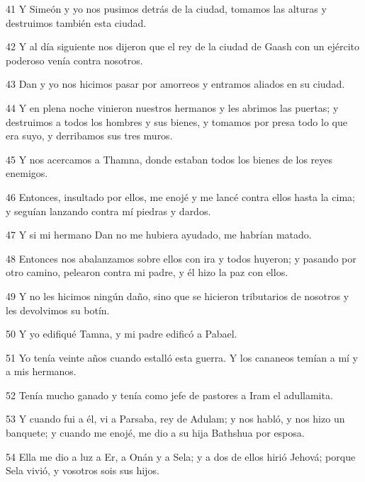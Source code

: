 \par 41 Y Simeón y yo nos pusimos detrás de la ciudad, tomamos las alturas y destruimos también esta ciudad.

\par 42 Y al día siguiente nos dijeron que el rey de la ciudad de Gaash con un ejército poderoso venía contra nosotros.

\par 43 Dan y yo nos hicimos pasar por amorreos y entramos aliados en su ciudad.

\par 44 Y en plena noche vinieron nuestros hermanos y les abrimos las puertas; y destruimos a todos los hombres y sus bienes, y tomamos por presa todo lo que era suyo, y derribamos sus tres muros.

\par 45 Y nos acercamos a Thamna, donde estaban todos los bienes de los reyes enemigos.

\par 46 Entonces, insultado por ellos, me enojé y me lancé contra ellos hasta la cima; y seguían lanzando contra mí piedras y dardos.

\par 47 Y si mi hermano Dan no me hubiera ayudado, me habrían matado.

\par 48 Entonces nos abalanzamos sobre ellos con ira y todos huyeron; y pasando por otro camino, pelearon contra mi padre, y él hizo la paz con ellos.

\par 49 Y no les hicimos ningún daño, sino que se hicieron tributarios de nosotros y les devolvimos su botín.

\par 50 Y yo edifiqué Tamna, y mi padre edificó a Pabael.

\par 51 Yo tenía veinte años cuando estalló esta guerra. Y los cananeos temían a mí y a mis hermanos.

\par 52 Tenía mucho ganado y tenía como jefe de pastores a Iram el adullamita.

\par 53 Y cuando fui a él, vi a Parsaba, rey de Adulam; y nos habló, y nos hizo un banquete; y cuando me enojé, me dio a su hija Bathshua por esposa.

\par 54 Ella me dio a luz a Er, a Onán y a Sela; y a dos de ellos hirió Jehová; porque Sela vivió, y vosotros sois sus hijos.

